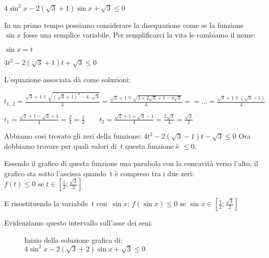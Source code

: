 \begin{esempio}
  $4 \sin^2 x - 2 (\sqrt{3} + 1) \sin x + \sqrt{3} \le 0$
  
  In un primo tempo possiamo considerare la disequazione come se la funzione 
  $\sin x$ fosse una semplice variabile.
  Per semplificarci la vita le cambiamo il nome:
  
  $\sin x = t$
  
  $4 t^2 - 2 (\sqrt{3} + 1) t + \sqrt{3} \le 0$
  
  L'equazione associata dà come soluzioni:
  
  $t_{1,~2} = 
   \frac{\sqrt{3} + 1 \mp \sqrt{(\sqrt{3} + 1)^2 - 4 \cdot \sqrt{3}}}{4} =  
   \frac{\sqrt{3} + 1 \mp \sqrt{3 + 2 \sqrt{3} +1 -  4 \sqrt{3}}}{4} = 
   = \dots = \frac{\sqrt{3} + 1 \mp (\sqrt{3} -1)}{4}$

  $t_{1} = \frac{\sqrt{3} + 1 - \sqrt{3} +1}{4} = 
           \frac{2}{4} = \frac{1}{2} \qquad
   t_{2} = \frac{\sqrt{3} + 1 + \sqrt{3} -1}{4} = 
           \frac{2 \sqrt{3}}{4} = \frac{\sqrt{3}}{2} $
  
  Abbiamo così trovato gli zeri della funzione: 
  $4 t^2 - 2 (\sqrt{3} - 1) t - \sqrt{3} \le 0$
  Ora dobbiamo trovare per quali valori di~$t$ questa funzione è $\le 0$.
  
  Essendo il grafico di questa funzione una parabola con la concavità verso 
  l'alto, il grafico sta sotto l'ascissa quando~t è compreso tra i due zeri:
  $f(t) \le 0 \text{ se } 
        t \in \left[\frac{1}{2}; \frac{\sqrt{3}}{2} \right]$ 
  
  E risostituendo la variabile~$t$ con~$\sin x$:
  $f(\sin x) \le 0 \text{ se } 
        \sin x \in \left[\frac{1}{2}; \frac{\sqrt{3}}{2} \right]$ 
        
  Evidenziamo questo intervallo sull'asse dei seni:
  
\begin{figure}[!h] 
 \vspace{-6pt}
  \begin{center}
\begin{inaccessibleblock}
    
    \caption{Inizio della soluzione grafica di: 
             $4 \sin^2 x - 2 (\sqrt{3} + 2) \sin x + \sqrt{3} \le 0$}
    \label{fig:trigo_disequ01a}
\end{inaccessibleblock}
  \end{center}
\vspace{-18pt}
\end{figure} 


\end{esempio}
